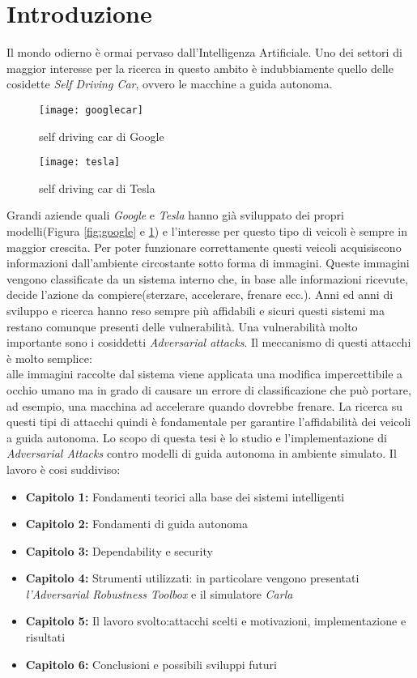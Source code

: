 \chapter*{Introduzione}
Il mondo odierno è ormai pervaso dall'Intelligenza Artificiale. Uno dei settori di maggior interesse per la
ricerca in questo ambito è indubbiamente quello delle cosidette \emph{Self Driving Car}, ovvero
le macchine a guida autonoma. 
\begin{figure}
  \centering
  \parbox{5cm}{
  \texttt{[image: googlecar]}
  \caption{self driving car di Google}
  \label{fig:google}}
  \qquad
  \begin{minipage}{5cm}
  \texttt{[image: tesla]}
  \caption{self driving car di Tesla}
  \label{fig:tesla}
  \end{minipage}
  \end{figure}
Grandi aziende quali \emph{Google} e \emph{Tesla} hanno già sviluppato
dei propri modelli(Figura \ref{fig:google} e \ref{fig:tesla}) e l'interesse per questo tipo di veicoli è sempre in  maggior crescita.
Per poter funzionare correttamente questi veicoli acquisiscono informazioni dall'ambiente circostante sotto forma di immagini.
Queste immagini vengono classificate da un sistema interno che, in base alle informazioni ricevute, decide l'azione da compiere(sterzare, accelerare, frenare ecc.).
Anni ed anni di sviluppo e ricerca hanno reso sempre più affidabili e sicuri  questi sistemi ma restano comunque presenti delle vulnerabilità. Una vulnerabilità
molto importante sono i cosiddetti \emph{Adversarial attacks}. Il meccanismo di questi attacchi è molto semplice:
\\
alle immagini raccolte dal sistema viene applicata una modifica impercettibile a occhio umano ma in grado di causare un errore di classificazione che può portare, ad esempio, una macchina ad accelerare quando
dovrebbe frenare. La ricerca su questi tipi di attacchi quindi è fondamentale per garantire l'affidabilità dei veicoli a guida autonoma.
Lo scopo di questa tesi è lo studio e l'implementazione di \emph{Adversarial Attacks} contro modelli di guida autonoma in ambiente simulato.
Il lavoro è cosi suddiviso:
\begin{itemize}
  \item \textbf{Capitolo 1:} Fondamenti teorici alla base dei sistemi intelligenti
  \item \textbf{Capitolo 2:} Fondamenti di guida autonoma
  \item \textbf{Capitolo 3:} Dependability e security
  \item \textbf{Capitolo 4:} Strumenti utilizzati: in particolare vengono presentati \emph{l'Adversarial Robustness Toolbox} e il simulatore \emph{Carla}
  \item \textbf{Capitolo 5:} Il lavoro svolto:attacchi scelti e motivazioni, implementazione e risultati
  \item \textbf{Capitolo 6:} Conclusioni e possibili sviluppi futuri
  
\end{itemize}


